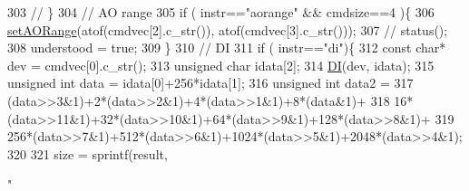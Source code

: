 \begin{DoxyCode}
{303   \textcolor{comment}{// \}}
304   \textcolor{comment}{// AO range }
305   \textcolor{keywordflow}{if} ( instr==\textcolor{stringliteral}{"aorange"} && cmdsize==4 )\{
306     \hyperlink{classServer__NI6008_aec1596005b4c75cc2c13d87ab3d9d120}{setAORange}(atof(cmdvec[2].c\_str()), atof(cmdvec[3].c\_str()));
307     \textcolor{comment}{//    status();}
308     understood = \textcolor{keyword}{true};
309   \}
310   \textcolor{comment}{// DI}
311   \textcolor{keywordflow}{if} ( instr==\textcolor{stringliteral}{"di"})\{
312     \textcolor{keyword}{const} \textcolor{keywordtype}{char}* dev = cmdvec[0].c\_str();
313     \textcolor{keywordtype}{unsigned} \textcolor{keywordtype}{char} idata[2];
314     \hyperlink{classServer__NI6008_a76b7491d11244e43a2fdb6d4783bd0f8}{DI}(dev, idata);
315     \textcolor{keywordtype}{unsigned} \textcolor{keywordtype}{int} data = idata[0]+256*idata[1];
316     \textcolor{keywordtype}{unsigned} \textcolor{keywordtype}{int} data2 = 
317       (data>>3&1)+2*(data>>2&1)+4*(data>>1&1)+8*(data&1)+
318       16*(data>>11&1)+32*(data>>10&1)+64*(data>>9&1)+128*(data>>8&1)+
319       256*(data>>7&1)+512*(data>>6&1)+1024*(data>>5&1)+2048*(data>>4&1);
320 
321     size = sprintf(result,\textcolor{stringliteral}{"%
       
}}
\end{DoxyCode}
